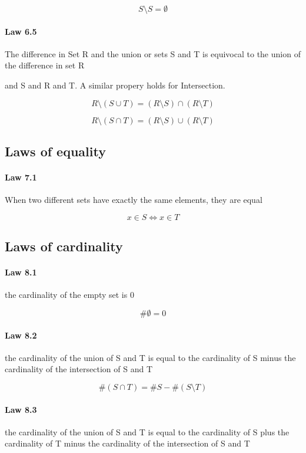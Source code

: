 \documentclass[twocolumn]{article}
\begin{document}
$$ S \setminus S =  \emptyset  $$

\paragraph{Law 6.5} The difference in Set R and the union or sets S and T is equivocal to the union of the difference in set R

and S and R and T. A similar propery holds for Intersection.

$$ R \setminus (S  \cup  T) = (R \setminus S)  \cap  (R \setminus T) $$

$$ R \setminus (S  \cap  T) = (R \setminus S)  \cup  (R \setminus T) $$

\subsection{Laws of equality}

\paragraph{Law 7.1} When two different sets have exactly the same elements, they are equal

$$ x \in S\iff x \in T $$

\clearpage

\subsection{Laws of cardinality}

\paragraph{Law 8.1} the cardinality of the empty set is 0

$$ \# \emptyset = 0 $$

\paragraph{Law 8.2} the cardinality of the union of S and T is equal to the cardinality of S minus the cardinality of the intersection of S and T

$$ \#(S  \cap  T) = \#S - \#(S\setminus T) $$

\paragraph{Law 8.3} the cardinality of the union of S and T is equal to the cardinality of S plus the cardinality of T minus the cardinality of the intersection of S and T
\end{document}
